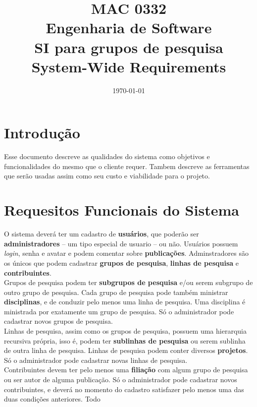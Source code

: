 \documentclass[11pt, a4paper]{article}
\title{MAC 0332\\
	Engenharia de Software\\
	SI para grupos de pesquisa\\
	System-Wide Requirements}
\date{\today}
\begin{document}
	\maketitle
	\newpage
	
	\section{Introdução}
		Esse documento descreve as qualidades do sistema como objetivos e 
		funcionalidades do mesmo que o cliente requer. Tambem descreve as 
		ferramentas que serão usadas assim como seu custo e viabilidade para 
		o projeto. 
	\section{Requesitos Funcionais do Sistema}
		O sistema deverá ter um cadastro de \textbf{usuários}, que poderão ser
		\textbf{administradores} -- um tipo especial de usuario -- ou não. Usuários possuem
		\textit{login}, senha e avatar e podem comentar sobre \textbf{publicações}. Adminstradores
		são os únicos que podem cadastrar \textbf{grupos de pesquisa}, \textbf{linhas de pesquisa} e
		\textbf{contribuintes}.\\
		\indent Grupos de pesquisa podem ter \textbf{subgrupos de pesquisa} e/ou serem subgrupo de
		outro grupo de pesquisa. Cada grupo de pesquisa pode também ministrar \textbf{disciplinas}, 
		e de conduzir pelo menos uma linha de pesquisa. Uma disciplina é ministrada por exatamente
		um grupo de pesquisa. Só o administrador pode cadastrar novos grupos de pesquisa.\\
		\indent Linhas de pesquisa, assim como os grupos de pesquisa, possuem uma hierarquia
		recursiva própria, isso é, podem ter \textbf{sublinhas de pesquisa} ou serem sublinha de
		outra linha de pesquisa. Linhas de pesquisa podem conter diversos \textbf{projetos}. Só o
		administrador pode cadastrar novas linhas de pesquisa.\\
		\indent Contribuintes devem ter pelo menos uma \textbf{filiação} com algum grupo de pesquisa
		ou ser autor de alguma publicação. Só o administrador pode cadastrar novos contribuintes, e
		deverá no momento do cadastro satisfazer pelo menos uma das duas condições anteriores. Todo
\end{document}
